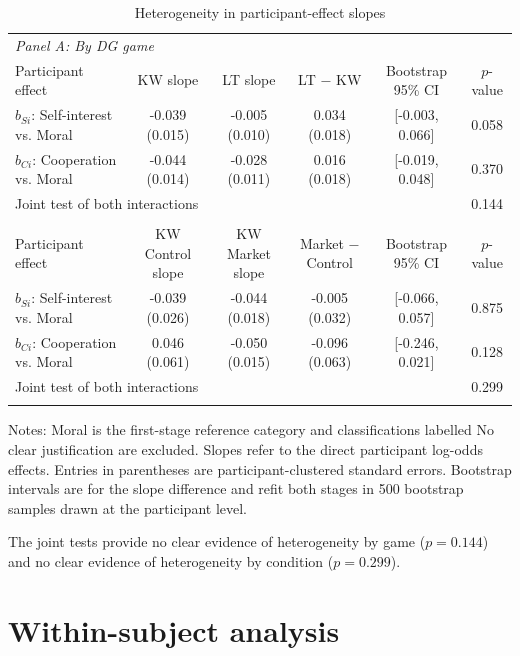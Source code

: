 \documentclass{article}
\begin{document}
\begin{table}[H]
\centering
\caption{Heterogeneity in participant-effect slopes}
\label{tab:hp_weight_heterogeneity}
\begin{tabular}{lccccc}
\toprule
\multicolumn{6}{l}{\textit{Panel A: By DG game}} \\
Participant effect & KW slope & LT slope & LT $-$ KW & Bootstrap 95\% CI & $p$-value \\
$b_{Si}$: Self-interest vs. Moral & -0.039 (0.015) & -0.005 (0.010) & 0.034 (0.018) & [-0.003, 0.066] & 0.058 \\
$b_{Ci}$: Cooperation vs. Moral & -0.044 (0.014) & -0.028 (0.011) & 0.016 (0.018) & [-0.019, 0.048] & 0.370 \\
\multicolumn{5}{l}{Joint test of both interactions} & 0.144 \\
\addlinespace
\multicolumn{6}{l}{\textit{Panel B: By condition, KW only}} \\
Participant effect & KW Control slope & KW Market slope & Market $-$ Control & Bootstrap 95\% CI & $p$-value \\
$b_{Si}$: Self-interest vs. Moral & -0.039 (0.026) & -0.044 (0.018) & -0.005 (0.032) & [-0.066, 0.057] & 0.875 \\
$b_{Ci}$: Cooperation vs. Moral & 0.046 (0.061) & -0.050 (0.015) & -0.096 (0.063) & [-0.246, 0.021] & 0.128 \\
\multicolumn{5}{l}{Joint test of both interactions} & 0.299 \\
\addlinespace
\bottomrule
\end{tabular}
\begin{flushleft}
\footnotesize Notes: Moral is the first-stage reference category and classifications labelled No clear justification are excluded. Slopes refer to the direct participant log-odds effects. Entries in parentheses are participant-clustered standard errors. Bootstrap intervals are for the slope difference and refit both stages in 500 bootstrap samples drawn at the participant level.
\end{flushleft}
\end{table}

The joint tests provide no clear evidence of heterogeneity by game ($p=0.144$) and no clear evidence of heterogeneity by condition ($p=0.299$).

\section{Within-subject analysis}
\end{document}
